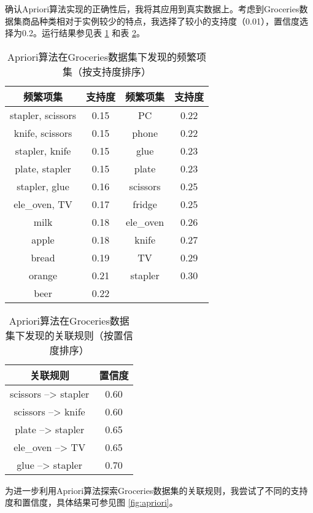 \documentclass[12pt,a4paper]{article}
\theoremstyle{definition}
\begin{document}
确认Apriori算法实现的正确性后，我将其应用到真实数据上。考虑到Groceries数据集商品种类相对于实例较少的特点，我选择了较小的支持度（0.01），置信度选择为0.2。运行结果参见表 \ref{tab:apriori_gro_sup} 和表 \ref{tab:apriori_gro_con}。

\begin{table}[H]
	\renewcommand\arraystretch{1.35}
	\caption{Apriori算法在Groceries数据集下发现的频繁项集（按支持度排序）}
	\label{tab:apriori_gro_sup}
	\centering
	
	\begin{tabular}{c|c|c|c}
		\centering
		频繁项集 & 支持度 & 频繁项集 & 支持度 \\
		\hline
		stapler, scissors & 0.15 & PC & 0.22 \\
		knife, scissors & 0.15 & phone & 0.22 \\
		stapler, knife & 0.15 & glue & 0.23 \\
		plate, stapler & 0.15 &plate & 0.23 \\
		stapler, glue & 0.16 & scissors & 0.25 \\
		ele\_oven, TV & 0.17 & fridge & 0.25 \\
		milk & 0.18 & ele\_oven & 0.26 \\
		apple & 0.18 & knife & 0.27 \\
		bread & 0.19 & TV & 0.29 \\
		orange & 0.21 & stapler & 0.30 \\
		beer & 0.22 & & \\		
	\end{tabular}
\end{table}

\begin{table}[H]
	\renewcommand\arraystretch{1.35}
	\caption{Apriori算法在Groceries数据集下发现的关联规则（按置信度排序）}
	\label{tab:apriori_gro_con}
	\centering
	
	\begin{tabular}{c|c}
		\centering
		关联规则 & 置信度 \\
		\hline
		scissors --> stapler & 0.60 \\
		scissors --> knife & 0.60 \\
		plate --> stapler & 0.65 \\
		ele\_oven --> TV & 0.65 \\
		glue --> stapler & 0.70 \\
	\end{tabular}
\end{table}

为进一步利用Apriori算法探索Groceries数据集的关联规则，我尝试了不同的支持度和置信度，具体结果可参见图 \ref{fig:apriori}。
\end{document}
